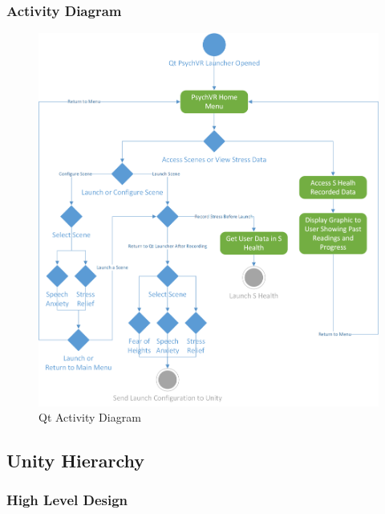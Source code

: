 \documentclass[a4paper,10pt]{article}
\begin{document}
		\subsubsection{Activity Diagram}
				\begin{figure}[H]
					\includegraphics[width=\linewidth,height=\paperheight,keepaspectratio]{qtActivityDiag.png}
					\caption{Qt Activity Diagram}
					\label{fig:qtactivity}
				\end{figure}
				\pagebreak
	\subsection{Unity Hierarchy}
		\subsubsection{High Level Design}
		\pagebreak
\end{document}
